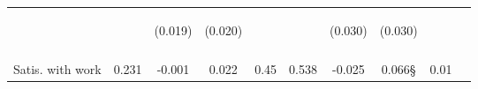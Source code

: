 \begin{table}[h!]
{\begin{tabular}{lccccccccc}
 & \begin{footnotesize}\end{footnotesize} & \begin{footnotesize}(0.019)\end{footnotesize} & \begin{footnotesize}(0.020)\end{footnotesize} & \begin{footnotesize}\end{footnotesize} & \begin{footnotesize}\end{footnotesize} & \begin{footnotesize}(0.030)\end{footnotesize} & \begin{footnotesize}(0.030)\end{footnotesize} & \begin{footnotesize}\end{footnotesize} & \begin{footnotesize}\end{footnotesize}\\
 & \begin{footnotesize}\end{footnotesize} & \begin{footnotesize}[0.032]\end{footnotesize} & \begin{footnotesize}[0.021]\end{footnotesize} & \begin{footnotesize}\end{footnotesize} & \begin{footnotesize}\end{footnotesize} & \begin{footnotesize}[0.753]\end{footnotesize} & \begin{footnotesize}[1.000]\end{footnotesize} & \begin{footnotesize}\end{footnotesize} & \begin{footnotesize}\end{footnotesize}\\
\noalign{\smallskip}Satis. with work & 0.231 & -0.001 & 0.022 & 0.45 & 0.538 & -0.025 & 0.066§ & 0.01 & \\

\end{tabular}}
\end{table}
